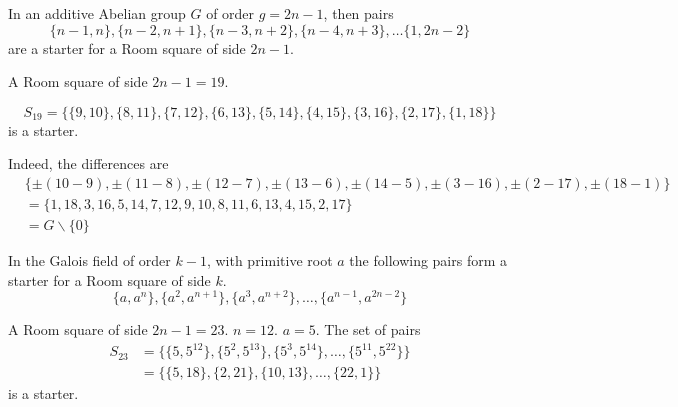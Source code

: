 \begin{lemma}
In an additive Abelian group $G$ of order $g = 2n-1$, then pairs
\begin{equation*}
  \{n - 1, n\}, \{n - 2, n + 1\}, \{n - 3, n + 2\}, \{n - 4, n + 3\}, \ldots\{1, 2n - 2\}
\end{equation*}
are a starter for a Room square of side $2n - 1$.
\end{lemma}

\begin{example}
A Room square of side $2n - 1 = 19$.

\begin{equation*}
S_{19} = \{\{9, 10\}, \{8, 11\}, \{7, 12\}, \{6, 13\}, \{5, 14\}, \{4, 15\}, \{3, 16\}, \{2, 17\}, \{1, 18\}\}
\end{equation*}
is a starter.

Indeed, the differences are
\begin{equation*}
\begin{split}
  & \{\pm(10 - 9), \pm(11 - 8), \pm(12 - 7), \pm(13 - 6), \pm(14 - 5), \pm(3 - 16), \pm(2 - 17), \pm(18 - 1)\} \\ 
  &= \{1, 18, 3, 16, 5, 14, 7, 12, 9, 10, 8, 11, 6, 13, 4, 15, 2, 17\} \\
  &= G \backslash \{0\}
\end{split}
\end{equation*}
\end{example}

\begin{lemma}
In the Galois field of order $k - 1$, with primitive root $a$ the following pairs form a starter for a Room square of side $k$.
\begin{equation}
  \{a, a^n\}, \{a^2, a^{n + 1}\}, \{a^3, a^{n + 2}\}, \ldots, \{a^{n - 1}, a^{2n - 2}\}
\end{equation}
\end{lemma}

\begin{example}
A Room square of side $2n - 1 = 23$. $n = 12$. $a = 5$.
The set of pairs
\begin{equation*}
\begin{split}
S_{23} &= \{\{5, 5^{12}\}, \{5^2, 5^{13}\}, \{5^3, 5^{14}\}, \ldots, \{5^{11}, 5^{22}\}\} \\
       &= \{\{5, 18\}, \{2, 21\}, \{10, 13\}, \ldots, \{22, 1\}\}
\end{split}
\end{equation*}
is a starter.
\end{example}

